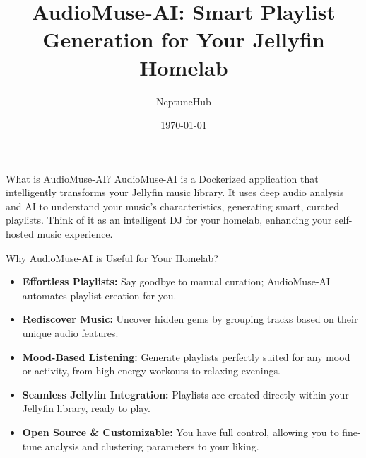 \documentclass{beamer}
\title{AudioMuse-AI: Smart Playlist Generation for Your Jellyfin Homelab}
\author{NeptuneHub}
\date{\today}
\begin{document}
\begin{frame}
    \titlepage
\end{frame}

\begin{frame}{What is AudioMuse-AI?}
    AudioMuse-AI is a Dockerized application that intelligently transforms your Jellyfin music library. It uses deep audio analysis and AI to understand your music's characteristics, generating smart, curated playlists. Think of it as an intelligent DJ for your homelab, enhancing your self-hosted music experience.
\end{frame}

\begin{frame}{Why AudioMuse-AI is Useful for Your Homelab?}
    \begin{itemize}
        \item \textbf{Effortless Playlists:} Say goodbye to manual curation; AudioMuse-AI automates playlist creation for you.
        \item \textbf{Rediscover Music:} Uncover hidden gems by grouping tracks based on their unique audio features.
        \item \textbf{Mood-Based Listening:} Generate playlists perfectly suited for any mood or activity, from high-energy workouts to relaxing evenings.
        \item \textbf{Seamless Jellyfin Integration:} Playlists are created directly within your Jellyfin library, ready to play.
        \item \textbf{Open Source \& Customizable:} You have full control, allowing you to fine-tune analysis and clustering parameters to your liking.
    \end{itemize}
\end{frame}
\end{document}

